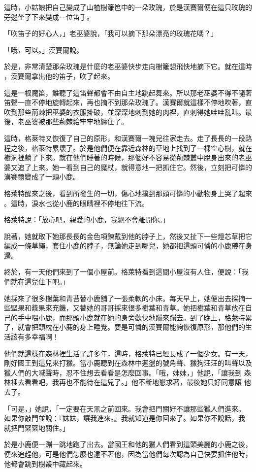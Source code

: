 \documentclass[oneside,10pt]{memoir} %
\begin{document}
這時，小姑娘把自己變成了山楂樹籬笆中的一朵玫瑰，於是漢賽爾便在這只玫瑰的
旁邊坐了下來變成一位笛手。

「吹笛子的好心人，」老巫婆說，「我可以摘下那朵漂亮的玫瑰花嗎？」

「哦，可以。」漢賽爾說。

於是，非常清楚那朵玫瑰是什麼的老巫婆快步走向樹籬想飛快地摘下它。就在這時
，漢賽爾拿出他的笛子，吹了起來。

這是一根魔笛，誰聽了這笛聲都會不由自主地跳起舞來。所以那老巫婆不得不隨著
笛聲一直不停地旋轉起來，再也摘不到那朵玫瑰了。漢賽爾就這樣不停地吹著，直
吹到那些荊棘把巫婆的衣服掛破，並深深地刺到她的肉裡，直刺得她哇哇亂叫。最
後，老巫婆被那些荊棘給牢牢地纏住了。

這時，格萊特又恢復了自己的原形，和漢賽爾一塊兒往家走去。走了長長的一段路
程之後，格萊特累壞了。於是他們便在靠近森林的草地上找到了一棵空心樹，就在
樹洞裡躺了下來。就在他們睡著的時候，那個好不容易從荊棘叢中脫身出來的老巫
婆又追了上來。她一看到自己的魔杖，就得意地一把抓住它。然後，立刻把可憐的
漢賽爾變成了一頭小鹿。

格萊特醒來之後，看到所發生的一切，傷心地撲到那頭可憐的小動物身上哭了起來
。這時，淚水也從小鹿的眼睛裡不停地往下流。

格萊特說：「放心吧，親愛的小鹿，我絕不會離開你。」

說著，她就取下她那長長的金色項鍊戴到他的脖子上，然後又扯下一些燈芯草把它
編成一條草繩，套住小鹿的脖子，無論她走到哪兒，她都把這頭可憐的小鹿帶在身
邊。

終於，有一天他們來到了一個小屋前。格萊特看到這間小屋沒有人住，便說：「我
們就在這兒住下吧。」

她採來了很多樹葉和青苔替小鹿舖了一張柔軟的小床。每天早上，她便出去採摘一
些堅果和漿果來充饑，又替她的哥哥採來很多樹葉和青草。她把樹葉和青草放在自
己的手中喂小鹿，而那頭小鹿就在她的身旁歡快地蹦來蹦去。到了晚上，格萊特累
了，就會把頭枕在小鹿的身上睡覺。要是可憐的漢賽爾能夠恢復原形，那他們的生
活該有多幸福啊！

他們就這樣在森林裡生活了許多年，這時，格萊特已經長成了一個少女。有一天，
剛好國王到這兒來打獵。當小鹿聽到在森林中迴盪的號角聲、獵狗汪汪的叫聲以及
獵人們的大喊聲時，忍不住想去看看是怎麼回事。「哦，妹妹，」他說，「讓我到
森林裡去看看吧，我再也不能待在這兒了。」他不斷地懇求著，最後她只好同意讓
他去了。

「可是，」她說，「一定要在天黑之前回來。我會把門關好不讓那些獵人們進來。
如果你敲門並說：『妹妹，讓我進來。』我就知道是你回來了。如果你不說話，我
就把門緊緊地關住。」

於是小鹿便一蹦一跳地跑了出去。當國王和他的獵人們看到這頭美麗的小鹿之後，
便來追趕他，可是他們怎麼也逮不著他，因為當他們每次認為自己快要抓住他時，
他都會跳到樹叢中藏起來。
\end{document}
